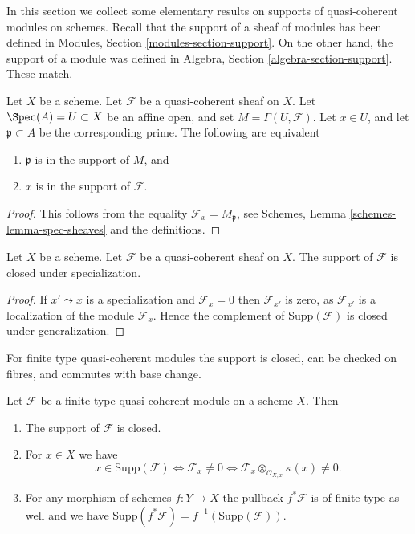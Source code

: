 \noindent
In this section we collect some elementary results on supports of
quasi-coherent modules on schemes.
Recall that the support of a sheaf of modules has been defined in
Modules, Section \ref{modules-section-support}.
On the other hand, the support of a module was defined in
Algebra, Section \ref{algebra-section-support}.
These match.

\begin{lemma}
\label{lemma-support-affine-open}
Let $X$ be a scheme. Let $\mathcal{F}$ be a quasi-coherent sheaf on $X$.
Let $\Spec(A) = U \subset X$ be an affine open, and set
$M = \Gamma(U, \mathcal{F})$.
Let $x \in U$, and let $\mathfrak p \subset A$ be the corresponding prime.
The following are equivalent
\begin{enumerate}
\item $\mathfrak p$ is in the support of $M$, and
\item $x$ is in the support of $\mathcal{F}$.
\end{enumerate}
\end{lemma}

\begin{proof}
This follows from the equality $\mathcal{F}_x = M_{\mathfrak p}$, see
Schemes, Lemma \ref{schemes-lemma-spec-sheaves}
and the definitions.
\end{proof}

\begin{lemma}
\label{lemma-support-closed-specialization}
Let $X$ be a scheme.
Let $\mathcal{F}$ be a quasi-coherent sheaf on $X$.
The support of $\mathcal{F}$ is closed under specialization.
\end{lemma}

\begin{proof}
If $x' \leadsto x$ is a specialization and $\mathcal{F}_x = 0$
then $\mathcal{F}_{x'}$ is zero, as $\mathcal{F}_{x'}$ is a localization
of the module $\mathcal{F}_x$. Hence the complement of
$\text{Supp}(\mathcal{F})$ is closed under generalization.
\end{proof}

\noindent
For finite type quasi-coherent modules the support is closed,
can be checked on fibres, and commutes with base change.

\begin{lemma}
\label{lemma-support-finite-type}
Let $\mathcal{F}$ be a finite type quasi-coherent module
on a scheme $X$. Then
\begin{enumerate}
\item The support of $\mathcal{F}$ is closed.
\item For $x \in X$ we have
$$
x \in \text{Supp}(\mathcal{F})
\Leftrightarrow
\mathcal{F}_x \not = 0
\Leftrightarrow
\mathcal{F}_x \otimes_{\mathcal{O}_{X, x}} \kappa(x) \not = 0.
$$
\item For any morphism of schemes $f : Y \to X$ the pullback
$f^*\mathcal{F}$ is of finite type as well and we have
$\text{Supp}(f^*\mathcal{F}) = f^{-1}(\text{Supp}(\mathcal{F}))$.
\end{enumerate}
\end{lemma}

